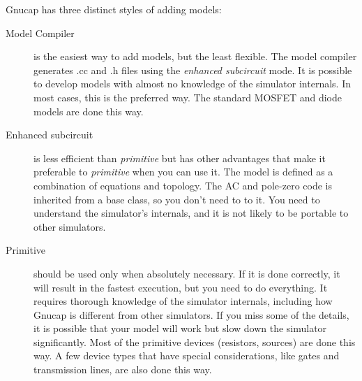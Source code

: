 %
%
%
%
Gnucap has three distinct styles of adding models:

\begin{description}
\item[Model Compiler] is the easiest way to add models, but the least
  flexible.  The model compiler generates .cc and .h files using the
  {\em enhanced subcircuit} mode.  It is possible to develop models
  with almost no knowledge of the simulator internals.  In most cases,
  this is the preferred way.  The standard MOSFET and diode models are
  done this way.
\item[Enhanced subcircuit] is less efficient than {\em primitive} but
  has other advantages that make it preferable to {\em primitive} when
  you can use it.  The model is defined as a combination of equations
  and topology.  The AC and pole-zero code is inherited from a base
  class, so you don't need to to it.  You need to understand the
  simulator's internals, and it is not likely to be portable to other
  simulators.
\item[Primitive] should be used only when absolutely necessary.  If it
  is done correctly, it will result in the fastest execution, but you
  need to do everything.  It requires thorough knowledge of the
  simulator internals, including how Gnucap is different from other
  simulators.  If you miss some of the details, it is possible that
  your model will work but slow down the simulator significantly.
  Most of the primitive devices (resistors, sources) are done this
  way.  A few device types that have special considerations, like
  gates and transmission lines, are also done this way.
\end{description}

